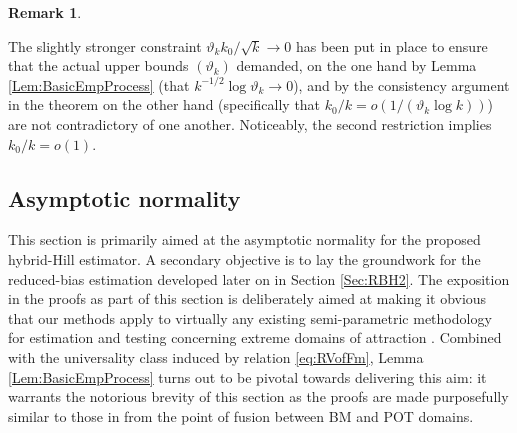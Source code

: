 \documentclass[11pt, a4paper, oneside]{article}
\numberwithin{equation}{section}
\theoremstyle{plain}
\theoremstyle{definition}
\newtheorem{rem}{Remark}
\begin{document}
%
\begin{rem}\label{Rem:Discussion}%

The slightly stronger constraint $\vartheta_k k_0 / \sqrt{k} \rightarrow 0$ has been put in place to ensure that the actual upper bounds $(\vartheta_k)$ demanded, on the one hand by Lemma \ref{Lem:BasicEmpProcess} (that   $k^{-1/2} \log \vartheta_k \rightarrow 0$), and by the consistency argument in the theorem on the other hand (specifically that $k_0/k = o(1 /(\vartheta_k \log k))$) are not contradictory of one another. Noticeably, the second restriction implies $k_0/k =o(1)$.
\end{rem}




\subsection{Asymptotic normality}

This section is primarily aimed at the asymptotic normality for the proposed hybrid-Hill estimator. A secondary objective is to lay the groundwork for the reduced-bias estimation developed later on in Section \ref{Sec:RBH2}. The exposition in the proofs as part of this section is deliberately aimed at making it obvious that our methods apply to virtually any existing semi-parametric methodology for estimation and testing concerning extreme domains of attraction \citep[see][]{Embrechtsetal1997,deHaanFerreira2006,Neves2009}. Combined with the universality class induced by relation \eqref{eq:RVofFm}, Lemma \ref{Lem:BasicEmpProcess} turns out to be pivotal towards delivering this aim: it warrants the notorious brevity of this section as the proofs are made purposefully similar to those in \citet[][Chapter 3]{deHaanFerreira2006} from the point of fusion between BM and POT domains. 
\end{document}
